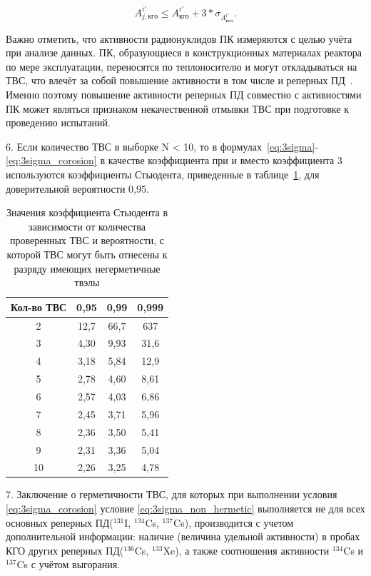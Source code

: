 \begin{equation} \label{eq:3sigma_corosion}
	A_{j,кго}^{i'} \leq {A}_{кго}^{i'} + 3*\sigma_{{A}_{кго}^{i'}}.
\end{equation}

Важно отметить, что активности радионуклидов ПК измеряются с целью учёта при анализе данных. ПК, образующиеся в конструкционных материалах реактора по мере эксплуатации, переносятся по теплоносителю и могут откладываться на ТВС, что влечёт за собой повышение активности в том числе и реперных ПД~\cite{corosion}. Именно поэтому повышение активности реперных ПД совместно с активностями ПК может являться признаком некачественной отмывки ТВС при подготовке к проведению испытаний.

6. Если количество ТВС в выборке N < 10, то в формулах~\ref{eq:3sigma}-\ref{eq:3sigma_corosion}  в качестве коэффициента при  и  вместо коэффициента 3 используются коэффициенты Стьюдента, приведенные в таблице~\ref{tab:Student}, для доверительной вероятности 0,95.
\begin{table}[H]
	\caption{Значения коэффициента Стьюдента в зависимости от количества проверенных ТВС и вероятности, с которой ТВС могут быть отнесены к разряду имеющих негерметичные твэлы} \label{tab:Student}
	\centering
	\begin{tabular}{|c|c|c|c|}
		\hline Кол-во ТВС & 0,95 & 0,99 & 0,999 \\ 
		\hline  2 & 12,7 & 66,7  & 637 \\ 
		\hline 3 &  4,30 &  9,93 & 31,6 \\ 
		\hline 4 &  3,18 &  5,84 & 12,9 \\ 
		\hline 5 &  2,78 &  4,60 & 8,61 \\ 
		\hline 6 &  2,57 &  4,03 & 6,86 \\ 
		\hline 7 &  2,45 &  3,71 & 5,96 \\ 
		\hline 8 &  2,36 &  3,50 & 5,41 \\ 
		\hline 9 &  2,31 &  3,36 & 5,04 \\ 
		\hline 10 & 2,26 &  3,25 & 4,78 \\ 
		\hline 
	\end{tabular} 
\end{table} 

7. Заключение о герметичности ТВС, для которых при выполнении
условия \ref{eq:3sigma_corosion} условие \ref{eq:3sigma_non_hermetic} выполняется не для всех основных реперных ПД($^{131}$I, $^{134}$Cs, $^{137}$Cs), производится с учетом дополнительной информации: наличие
(величина удельной активности) в пробах КГО других реперных ПД($^{136}$Cs, $^{133}$Xe), а также соотношения активности $^{134}$Cs и $^{137}$Cs с учётом выгорания.

